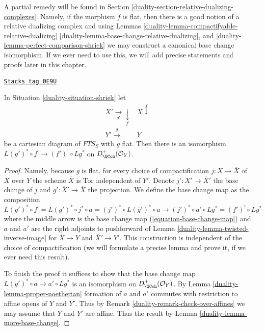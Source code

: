 \medskip\noindent
A partial remedy will be found in
Section \ref{duality-section-relative-dualizing-complexes}.
Namely, if the morphism $f$ is flat, then there is a good
notion of a relative dualizing complex and using
Lemmas \ref{duality-lemma-compactifyable-relative-dualizing}
\ref{duality-lemma-base-change-relative-dualizing},
and \ref{duality-lemma-perfect-comparison-shriek}
we may construct a canonical base change isomorphism.
If we ever need to use this, we will add precise statements and
proofs later in this chapter.

\begin{lemma}
\label{duality-lemma-base-change-shriek-flat}
\href{https://stacks.math.columbia.edu/tag/0E9U}{\texttt{Stacks tag 0E9U}}

In Situation \ref{duality-situation-shriek} let
$$
\begin{array}{cc}X' \underset{g'}{\longrightarrow}\underset{f'}{\downarrow} & X \overset{f}{\downarrow} \\ Y' \overset{g}{\longrightarrow} & Y\end{array}
$$
be a cartesian diagram of $\textit{FTS}_S$ with $g$ flat.
Then there is an isomorphism
$L(g')^* \circ f^! \to (f')^! \circ Lg^*$ on
$D_\QCoh^+(\mathcal{O}_Y)$.
\end{lemma}

\begin{proof}

Namely, because $g$ is flat, for every choice of
compactification $j : X \to \overline{X}$ of $X$ over $Y$
the scheme $\overline{X}$ is Tor independent of $Y'$.
Denote $j' : X' \to \overline{X}'$ the
base change of $j$ and $\overline{g}' : \overline{X}' \to \overline{X}$
the projection. We define the base change map as the composition
$$
L(g')^* \circ f^! = L(g')^* \circ j^* \circ a =
(j')^* \circ L(\overline{g}')^* \circ a \longrightarrow
(j')^* \circ a' \circ Lg^* = (f')^! \circ Lg^*
$$
where the middle arrow is the base change map
(\ref{equation-base-change-map})
and $a$ and $a'$ are the right adjoints to pushforward
of Lemma \ref{duality-lemma-twisted-inverse-image}
for $\overline{X} \to Y$ and $\overline{X}' \to Y'$.
This construction is independent of the choice of
compactification (we will formulate a precise lemma
and prove it, if we ever need this result).

\medskip\noindent
To finish the proof it suffices to show that the base change
map $L(g')^* \circ a \to a' \circ Lg^*$ is an isomorphism
on $D_\QCoh^+(\mathcal{O}_Y)$.
By Lemma \ref{duality-lemma-proper-noetherian} formation of $a$ and $a'$
commutes with restriction to affine opens of $Y$ and $Y'$.
Thus by Remark \ref{duality-remark-check-over-affines}
we may assume that $Y$ and $Y'$ are affine.
Thus the result by Lemma \ref{duality-lemma-more-base-change}.
\end{proof}

